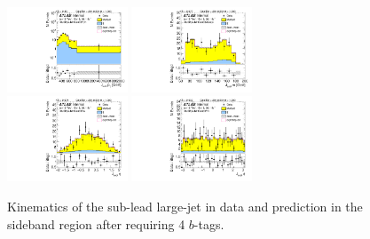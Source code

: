 \begin{figure}[htbp!]
\begin{center}
\includegraphics[width=0.32\textwidth,angle=-90]{figures/boosted/Sideband/b77_FourTag_Sideband_sublHCand_Pt_m_1.pdf}
\includegraphics[width=0.32\textwidth,angle=-90]{figures/boosted/Sideband/b77_FourTag_Sideband_sublHCand_Mass_s.pdf}\\
\includegraphics[width=0.32\textwidth,angle=-90]{figures/boosted/Sideband/b77_FourTag_Sideband_sublHCand_Eta.pdf}
\includegraphics[width=0.32\textwidth,angle=-90]{figures/boosted/Sideband/b77_FourTag_Sideband_sublHCand_Phi.pdf}
  \caption{Kinematics of the sub-lead large-\R jet in data and prediction in the sideband region after requiring 4 $b$-tags.}
  \label{fig:boosted-4b-sideband-ak10-subl}
\end{center}
\end{figure}


